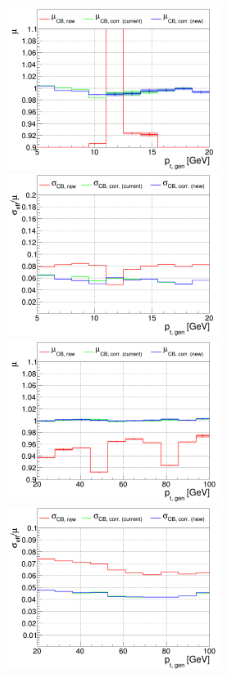 \begin{figure}
\includegraphics[width=0.495\textwidth]{./plots_pdf/ECAL_plots/plotsNoPU/EE/pdf/FULL/GENPT/EEFULL_GENPT_0005_0020_MuOverBins.pdf}
\includegraphics[width=0.495\textwidth]{./plots_pdf/ECAL_plots/plotsNoPU/EE/pdf/FULL/GENPT/EEFULL_GENPT_0005_0020_EffSigmaOverBins.pdf}
\includegraphics[width=0.495\textwidth]{./plots_pdf/ECAL_plots/plotsNoPU/EE/pdf/FULL/GENPT/EEFULL_GENPT_0020_0100_MuOverBins.pdf}
\includegraphics[width=0.495\textwidth]{./plots_pdf/ECAL_plots/plotsNoPU/EE/pdf/FULL/GENPT/EEFULL_GENPT_0020_0100_EffSigmaOverBins.pdf}

\end{figure}

